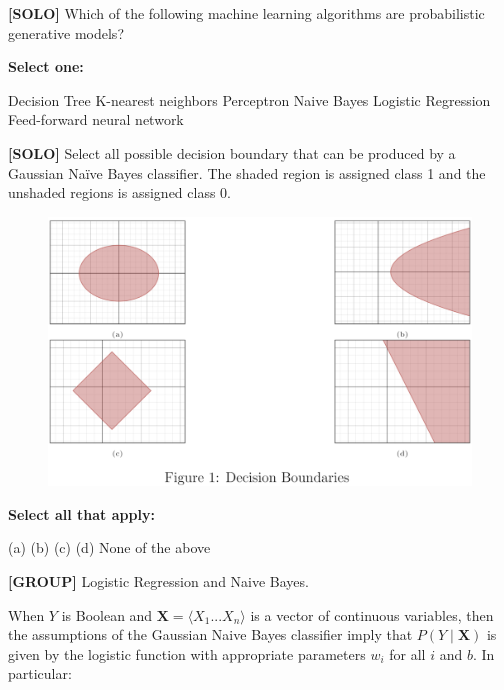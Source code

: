 \documentclass[11pt,addpoints,answers]{exam}
\newcommand{\Xv}{\mathbf{X}}
\newcommand{\solo}{\textbf{[SOLO]} }
\newcommand{\group}{\textbf{[GROUP]} }
\begin{document}
\begin{questions}
\begin{tcolorbox}[fit,height=1cm, width=4cm, blank, borderline={1pt}{-2pt},nobeforeafter]
    \end{tcolorbox}
    
    
    \question[3] \solo Which of the following machine learning algorithms are probabilistic generative models?

    \textbf{Select one:}
    \begin{checkboxes}
        \choice Decision Tree
        \choice K-nearest neighbors
        \choice Perceptron
        \choice Naive Bayes
        \choice Logistic Regression
        \choice Feed-forward neural network
    \end{checkboxes}
    

    \question[2]\solo Select all possible decision boundary that can be produced by a Gaussian Naïve Bayes classifier. The shaded region is assigned class 1 and the unshaded regions is assigned class 0.
    \begin{figure}[H]
        \centering
        \includegraphics[scale=0.45]{figs/GNB_decision_boundary.png}
    \end{figure}
    
    \textbf{Select all that apply:}
    {\checkboxchar{$\Box$} \checkedchar{$\blacksquare$}
    \begin{checkboxes}
        \choice (a)
        \choice (b)
        \choice (c)
        \choice (d)
        \choice None of the above
    \end{checkboxes}
    }
    
    

    \question[4]\group Logistic Regression and Naive Bayes. 

When $Y$ is Boolean and $\Xv = \langle{X_{1}...X_{n}}\rangle$ is a vector of continuous variables, then the assumptions of the Gaussian Naive Bayes classifier imply that $P(Y \mid \Xv)$ is given by the logistic function with
appropriate parameters $w_i$ for all $i$ and $b$. In particular:


\end{questions}
\end{document}
